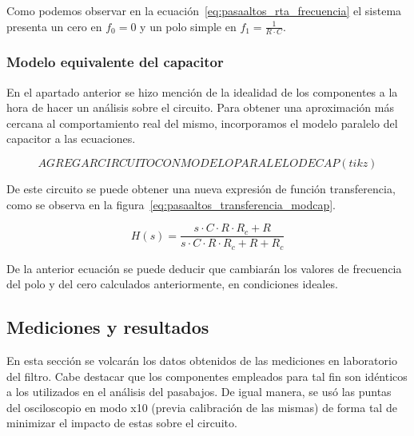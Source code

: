 Como podemos observar en la ecuación~\ref{eq:pasaaltos_rta_frecuencia} el sistema presenta un cero en $f_0 = 0$ y un polo simple en $f_1 = \frac{1}{R \cdot C}$.

\subsubsection{Modelo equivalente del capacitor}

En el apartado anterior se hizo mención de la idealidad de los componentes a la hora de hacer un análisis sobre el circuito.
 Para obtener una aproximación más cercana al comportamiento real del mismo, incorporamos el modelo paralelo del capacitor a las ecuaciones.

 \begin{equation*}
    AGREGAR CIRCUITO CON MODELO PARALELO DE CAP (tikz)
 \end{equation*}


 De este circuito se puede obtener una nueva expresión de función transferencia, como se observa en la figura~\ref{eq:pasaaltos_transferencia_modcap}.

 \begin{equation}\label{eq:pasaaltos_transferencia_modcap}
    H(s) = \frac{s \cdot C \cdot R \cdot R_c + R}{s \cdot C \cdot R \cdot R_c + R + R_c}
\end{equation}

De la anterior ecuación se puede deducir que cambiarán los valores de frecuencia del polo y del cero calculados anteriormente, en condiciones ideales.

\subsection{Mediciones y resultados}

En esta sección se volcarán los datos obtenidos de las mediciones en laboratorio del filtro. Cabe destacar que los componentes empleados para tal fin son idénticos a los utilizados en el análisis del pasabajos.
De igual manera, se usó las puntas del osciloscopio en modo x10 (previa calibración de las mismas) de forma tal de minimizar el impacto de estas sobre el circuito.

